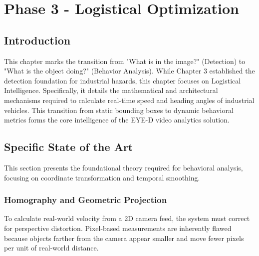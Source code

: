 ﻿\chapter{Phase 3 - Logistical Optimization}
\setcounter{section}{0}
\renewcommand{\thesection}{\arabic{section}}
\label{chap:logistics}

\section*{Introduction}
This chapter marks the transition from "What is in the image?" (Detection) to "What is the object doing?" (Behavior Analysis). While Chapter 3 established the detection foundation for industrial hazards, this chapter focuses on Logistical Intelligence. Specifically, it details the mathematical and architectural mechanisms required to calculate real-time speed and heading angles of industrial vehicles. This transition from static bounding boxes to dynamic behavioral metrics forms the core intelligence of the EYE-D video analytics solution.

\section{Specific State of the Art}
This section presents the foundational theory required for behavioral analysis, focusing on coordinate transformation and temporal smoothing.

\subsection{Homography and Geometric Projection}
\label{subsec:homography}
To calculate real-world velocity from a 2D camera feed, the system must correct for perspective distortion. Pixel-based measurements are inherently flawed because objects farther from the camera appear smaller and move fewer pixels per unit of real-world distance. 

